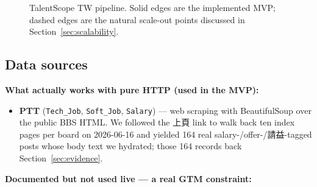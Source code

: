 \documentclass[11pt,a4paper]{article}
\begin{document}
\begin{figure}[h]
{%
}
\caption{TalentScope TW pipeline. Solid edges are the implemented MVP;
dashed edges are the natural scale-out points discussed in
Section~\ref{sec:scalability}.}
\label{fig:arch}
\end{figure}

\subsection{Data sources}

\textbf{What actually works with pure HTTP (used in the MVP):}

\begin{itemize}[leftmargin=*,itemsep=0.1em,topsep=0.2em]
  \item \textbf{PTT} (\texttt{Tech\_Job}, \texttt{Soft\_Job},
    \texttt{Salary}) --- web scraping with BeautifulSoup over the
    public BBS HTML. We followed the 上頁 link to walk back ten
    index pages per board on 2026-06-16 and yielded 164 real
    salary-/offer-/請益-tagged posts whose body text we hydrated;
    those 164 records back Section~\ref{sec:evidence}.
\end{itemize}

\textbf{Documented but not used live --- a real GTM constraint:}
\end{document}

